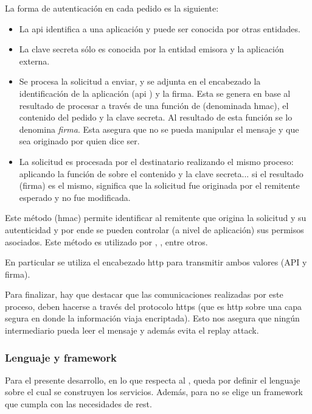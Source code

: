 La forma de autenticación en cada pedido es la siguiente:
\begin{itemize}
\item La \gls{api}  identifica a una aplicación y puede ser conocida por otras entidades.
\item La clave secreta sólo es conocida por la entidad emisora y la aplicación externa.
\item Se procesa la solicitud a enviar, y se adjunta en el encabezado la identificación de la aplicación (\gls{api} ) y la firma. Esta se genera en base al resultado de procesar a través de una función de  (denominada \gls{hmac}), el contenido del pedido y la clave secreta. Al resultado de esta función se lo denomina \textit{firma}. Esta asegura que no se pueda manipular el mensaje y que sea originado por quien dice ser.
\item La solicitud es procesada por el destinatario realizando el mismo proceso: aplicando la función de  sobre el contenido y la clave secreta... si el resultado (firma) es el mismo, significa que la solicitud fue originada por el remitente esperado y no fue modificada.
\end{itemize}

Este método (\gls{hmac}) permite identificar al remitente que origina la solicitud y su autenticidad\cite{krawczyk1997rfc} y por ende se pueden controlar (a nivel de aplicación) sus permisos asociados. Este método es utilizado por \cite{amazonApi}, ,  entre otros.

En particular se utiliza el encabezado \gls{http}  para transmitir ambos valores (API  y firma).

Para finalizar, hay que destacar que las comunicaciones realizadas por este proceso, deben hacerse a través del protocolo \gls{https} (que es \gls{http} sobre una capa segura en donde la información viaja encriptada).
Esto nos asegura que ningún intermediario pueda leer el mensaje y además evita el \gls{replay attack}.

\subsubsection{Lenguaje y \gls{framework}}
\label{backend_lenguaje_framework}

Para el presente desarrollo, en lo que respecta al , queda por definir el lenguaje sobre el cual se construyen los servicios. Además, para no  se elige un \gls{framework} que cumpla con las necesidades de \gls{rest}.

